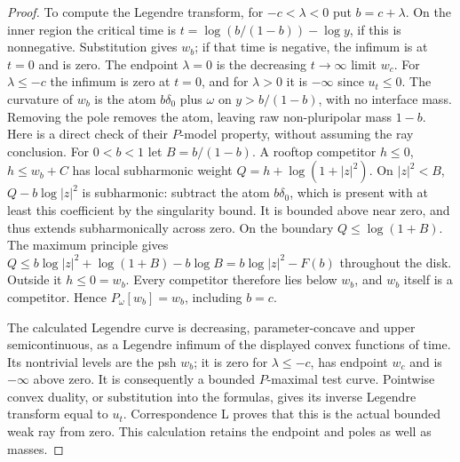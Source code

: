 \documentclass[11pt]{article}
\theoremstyle{remark}\newtheorem{remark}[theorem]{Remark}
\begin{document}
\begin{proof}
To compute the Legendre transform, for $-c<\lambda<0$ put
$b=c+\lambda$. On the inner region the critical time is
$t=\log(b/(1-b)) -\log y$, if this is nonnegative.
Substitution gives $w_b$; if that time is negative, the infimum is at
$t=0$ and is zero. The endpoint $\lambda=0$ is the decreasing
$t\to\infty$ limit $w_c$. For $\lambda\leq-c$ the infimum is zero
at $t=0$, and for $\lambda>0$ it is $-\infty$ since $u_t\leq0$.
The curvature of $w_b$ is the atom $b\delta_0$ plus $\omega$ on
$y>b/(1-b)$, with no interface mass. Removing the pole removes
the atom, leaving raw non-pluripolar mass $1-b$.
Here is a direct check of their $P$-model property, without assuming
the ray conclusion. For $0<b<1$ let $B=b/(1-b)$. A rooftop
competitor $h\leq0$, $h\leq w_b+C$ has local subharmonic weight
$Q=h+\log(1+|z|^2)$. On $|z|^2<B$, $Q-b\log|z|^2$ is
subharmonic: subtract the atom $b\delta_0$, which is present with
at least this coefficient by the singularity bound. It is bounded
above near zero, and thus extends subharmonically across zero.
On the boundary $Q\leq\log(1+B)$. The maximum principle gives
$Q\leq b\log|z|^2+\log(1+B)-b\log B
=b\log|z|^2-F(b)$ throughout the disk. Outside it $h\leq0=w_b$.
Every competitor therefore lies below $w_b$, and $w_b$ itself is a
competitor. Hence $P_\omega[w_b]=w_b$, including $b=c$.

The calculated Legendre curve is decreasing, parameter-concave and
upper semicontinuous, as a Legendre infimum of the displayed convex
functions of time. Its nontrivial levels are the psh $w_b$; it is
zero for $\lambda\leq-c$, has endpoint $w_c$ and is $-\infty$
above zero. It is consequently a bounded $P$-maximal test curve.
Pointwise convex duality, or substitution into the formulas, gives
its inverse Legendre transform equal to $u_t$. Correspondence L
proves that this is the actual bounded weak ray from zero.
This calculation retains the endpoint and poles as well as masses.
\end{proof}
\end{document}
